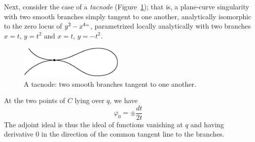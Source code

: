 \begin{example}[tacnodes]
Next, consider the case of a \emph{tacnode} (Figure~\ref{Fig14.4}); that
is, a plane-curve singularity with two smooth branches simply tangent
to one another, analytically isomorphic to the zero locus of $y^2-x^4`
`$, parametrized locally analytically with two branches $x = t$, $y =
t^{2}$ and $x=t$, $y = -t^{2}$.

\begin{figure}
\centerline {\includegraphics[width=2in]{"main/Fig14-4"}}
\caption{A tacnode: two smooth branches tangent to one another.}
\label{Fig14.4}
\end{figure}

At the two points of $C$ lying over $q$, we have
  $$
 \varphi_0 =  \pm\frac{dt}{ 2t} 
 $$
%
The adjoint ideal is thus the ideal of functions vanishing at $q$
and having derivative 0 in the direction of the common tangent line to
the branches.
\end{example}

